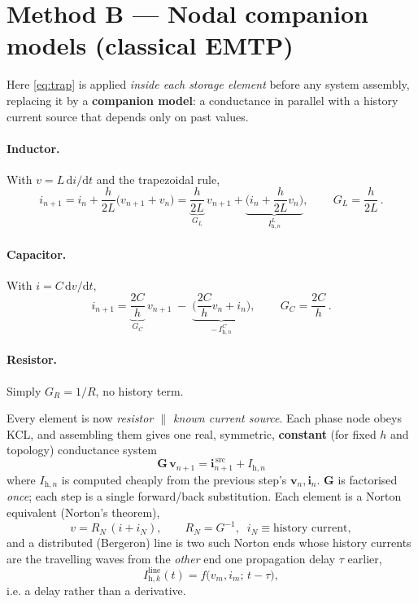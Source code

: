 \documentclass[11pt]{article}
\newcommand{\dd}{\mathrm{d}}
\newcommand{\hstep}{h}
\newcommand{\vv}{\mathbf{v}}
\newcommand{\ii}{\mathbf{i}}
\begin{document}
\section{Method B --- Nodal companion models (classical EMTP)}

Here \eqref{eq:trap} is applied \emph{inside each storage element} before any
system assembly, replacing it by a \textbf{companion model}: a conductance in
parallel with a history current source that depends only on past values.

\paragraph{Inductor.} With $v=L\,\dd i/\dd t$ and the trapezoidal rule,
\begin{equation}
i_{n+1} = i_n + \frac{\hstep}{2L}\big(v_{n+1}+v_n\big)
= \underbrace{\frac{\hstep}{2L}}_{G_L}\,v_{n+1}
+ \underbrace{\Big(i_n + \frac{\hstep}{2L}v_n\Big)}_{I_{\mathrm{h},n}^{L}} ,
\qquad
\boxed{\,G_L=\dfrac{\hstep}{2L}\,}.
\label{eq:compL}
\end{equation}

\paragraph{Capacitor.} With $i=C\,\dd v/\dd t$,
\begin{equation}
i_{n+1} = \underbrace{\frac{2C}{\hstep}}_{G_C}\,v_{n+1}
\;-\;\underbrace{\Big(\frac{2C}{\hstep}v_n + i_n\Big)}_{-\,I_{\mathrm{h},n}^{C}},
\qquad
\boxed{\,G_C=\dfrac{2C}{\hstep}\,}.
\label{eq:compC}
\end{equation}

\paragraph{Resistor.} Simply $G_R = 1/R$, no history term.

\medskip
Every element is now \emph{resistor $\parallel$ known current source}. Each phase
node obeys KCL, and assembling them gives one real, symmetric, \textbf{constant}
(for fixed $\hstep$ and topology) conductance system
\begin{equation}
\boxed{\;\mathbf{G}\,\vv_{n+1} = \ii^{\,\text{src}}_{n+1} + I_{\mathrm{h},n}\;}
\label{eq:nodal}
\end{equation}
where $I_{\mathrm{h},n}$ is computed cheaply from the previous step's $\vv_n,\ii_n$.
$\mathbf{G}$ is factorised \emph{once}; each step is a single forward/back
substitution. Each element is a Norton equivalent (Norton's theorem),
\[
v = R_N\,(i + i_N), \qquad R_N = G^{-1},\;\; i_N \equiv \text{history current},
\]
and a distributed (Bergeron) line is two such Norton ends whose history currents
are the travelling waves from the \emph{other} end one propagation delay $\tau$
earlier,
\begin{equation}
I_{\mathrm{h},k}^{\text{line}}(t) = f\big(v_m,i_m;\,t-\tau\big),
\end{equation}
i.e. a delay rather than a derivative.
\end{document}
